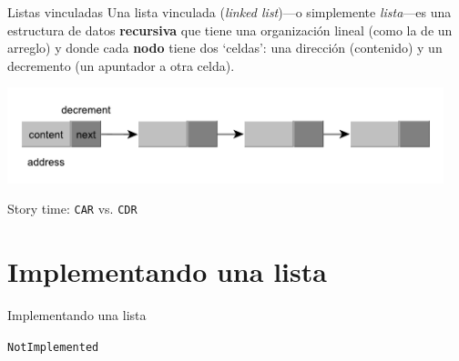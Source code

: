 \documentclass[spanish, c]{beamer}
\begin{document}
\begin{frame}{Listas vinculadas}
    Una \alert{lista vinculada} (\textit{linked list})---o simplemente \textit{lista}---es una estructura de datos \textbf{recursiva} que tiene una organización lineal (como la de un arreglo) y donde cada \textbf{nodo} tiene dos `celdas': una dirección (contenido) y un decremento (un apuntador a otra celda).

    \bigskip

    \begin{center}
        \includegraphics[width=0.95\textwidth]{list.pdf}
    \end{center} \pause

    \bigskip

    \begin{center}
        Story time: \texttt{CAR} vs. \texttt{CDR}
    \end{center}
\end{frame}

\section{Implementando una lista}

\begin{frame}{Implementando una lista}

    \Huge
    \texttt{NotImplemented}
\end{frame}




\end{document}
